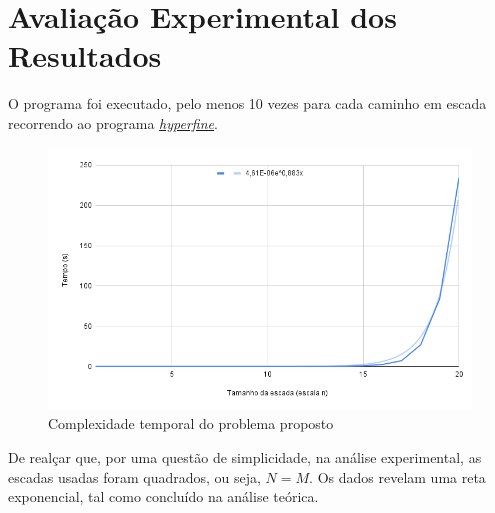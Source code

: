 \documentclass[12pt,a4paper]{article}
\begin{document}
  \section{Avaliação Experimental dos Resultados}

  O programa foi executado, pelo menos 10 vezes para cada caminho em escada recorrendo ao programa \href{https://github.com/sharkdp/hyperfine}{\textit{hyperfine}}.

  \begin{figure}[H]
    \centering
    \includegraphics[width=5in]{report.png}
    \caption{Complexidade temporal do problema proposto}
    \label{fig:graphic}
  \end{figure}

  De realçar que, por uma questão de simplicidade, na análise experimental, as escadas usadas foram quadrados, ou seja, $N = M$.
  Os dados revelam uma reta exponencial, tal como concluído na análise teórica.

  \printbibliography[title={Referência}]
\end{document}
